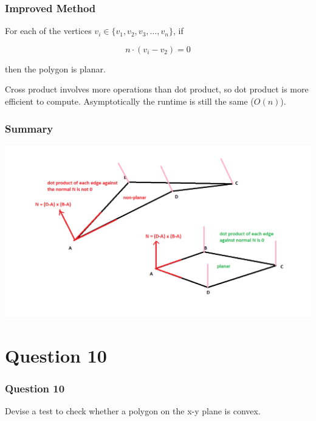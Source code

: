 \documentclass{beamer}
\begin{document}
\begin{frame}
    \frametitle{Improved Method}

    For each of the vertices $v_i \in \{v_1, v_2, v_3, \dots, v_n\}$, if 

    $$
    n \cdot (v_i - v_2) = 0
    $$

    then the polygon is planar.

    \begin{tcolorbox}
        Cross product involves more operations than dot product, so dot product is more efficient to compute. 
        Asymptotically the runtime is still the same ($O(n)$).
    \end{tcolorbox}

\end{frame}

\begin{frame}
    \frametitle{Summary}

    \centering
    \includegraphics[scale=0.3]{q9-planar.png}

\end{frame}

\section{Question 10}

\begin{frame}
    \frametitle{Question 10}

    Devise a test to check whether a polygon on the x-y plane is convex.
\end{frame}
\end{document}
